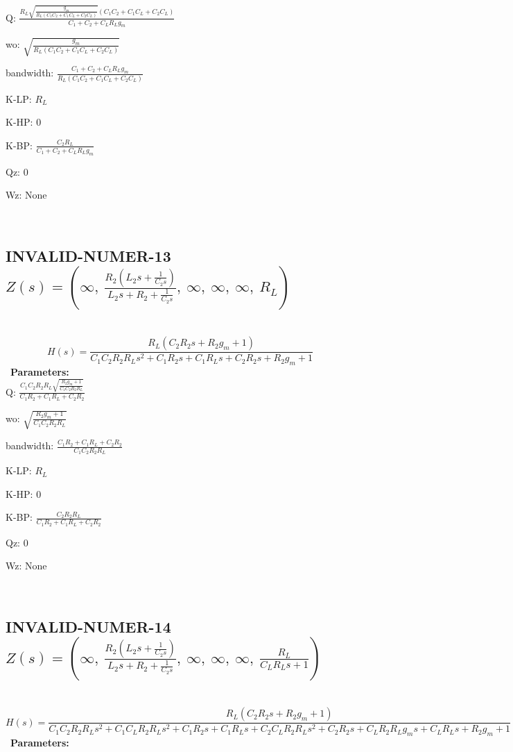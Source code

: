 \documentclass{article}
\begin{document}
Q: $\frac{R_{L} \sqrt{\frac{g_{m}}{R_{L} \left(C_{1} C_{2} + C_{1} C_{L} + C_{2} C_{L}\right)}} \left(C_{1} C_{2} + C_{1} C_{L} + C_{2} C_{L}\right)}{C_{1} + C_{2} + C_{L} R_{L} g_{m}}$\ 

wo: $\sqrt{\frac{g_{m}}{R_{L} \left(C_{1} C_{2} + C_{1} C_{L} + C_{2} C_{L}\right)}}$\ 

bandwidth: $\frac{C_{1} + C_{2} + C_{L} R_{L} g_{m}}{R_{L} \left(C_{1} C_{2} + C_{1} C_{L} + C_{2} C_{L}\right)}$\ 

K-LP: $R_{L}$\ 

K-HP: $0$\ 

K-BP: $\frac{C_{2} R_{L}}{C_{1} + C_{2} + C_{L} R_{L} g_{m}}$\ 

Qz: $0$\ 

Wz: $\text{None}$\ 

\ 

\subsection{INVALID-NUMER-13 $Z(s) = \left( \infty, \  \frac{R_{2} \left(L_{2} s + \frac{1}{C_{2} s}\right)}{L_{2} s + R_{2} + \frac{1}{C_{2} s}}, \  \infty, \  \infty, \  \infty, \  R_{L}\right)$ } \ 
\textbf{\[H(s) = \frac{R_{L} \left(C_{2} R_{2} s + R_{2} g_{m} + 1\right)}{C_{1} C_{2} R_{2} R_{L} s^{2} + C_{1} R_{2} s + C_{1} R_{L} s + C_{2} R_{2} s + R_{2} g_{m} + 1}\] } \ 
\textbf{Parameters:}\\ 

Q: $\frac{C_{1} C_{2} R_{2} R_{L} \sqrt{\frac{R_{2} g_{m} + 1}{C_{1} C_{2} R_{2} R_{L}}}}{C_{1} R_{2} + C_{1} R_{L} + C_{2} R_{2}}$\ 

wo: $\sqrt{\frac{R_{2} g_{m} + 1}{C_{1} C_{2} R_{2} R_{L}}}$\ 

bandwidth: $\frac{C_{1} R_{2} + C_{1} R_{L} + C_{2} R_{2}}{C_{1} C_{2} R_{2} R_{L}}$\ 

K-LP: $R_{L}$\ 

K-HP: $0$\ 

K-BP: $\frac{C_{2} R_{2} R_{L}}{C_{1} R_{2} + C_{1} R_{L} + C_{2} R_{2}}$\ 

Qz: $0$\ 

Wz: $\text{None}$\ 

\ 

\subsection{INVALID-NUMER-14 $Z(s) = \left( \infty, \  \frac{R_{2} \left(L_{2} s + \frac{1}{C_{2} s}\right)}{L_{2} s + R_{2} + \frac{1}{C_{2} s}}, \  \infty, \  \infty, \  \infty, \  \frac{R_{L}}{C_{L} R_{L} s + 1}\right)$ } \ 
\textbf{\[H(s) = \frac{R_{L} \left(C_{2} R_{2} s + R_{2} g_{m} + 1\right)}{C_{1} C_{2} R_{2} R_{L} s^{2} + C_{1} C_{L} R_{2} R_{L} s^{2} + C_{1} R_{2} s + C_{1} R_{L} s + C_{2} C_{L} R_{2} R_{L} s^{2} + C_{2} R_{2} s + C_{L} R_{2} R_{L} g_{m} s + C_{L} R_{L} s + R_{2} g_{m} + 1}\] } \ 
\textbf{Parameters:}\\ 
\end{document}
